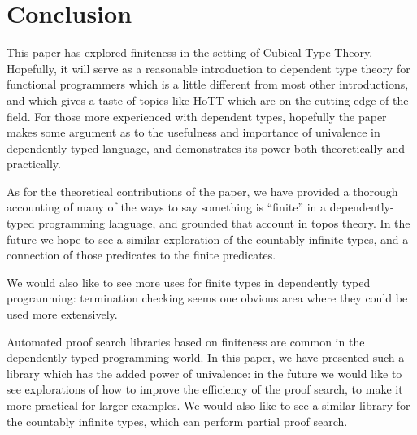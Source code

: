 \section{Conclusion}
This paper has explored finiteness in the setting of Cubical Type Theory.
Hopefully, it will serve as a reasonable introduction to dependent type theory
for functional programmers which is a little different from most other
introductions, and which gives a taste of topics like HoTT which are on the
cutting edge of the field.
For those more experienced with dependent types, hopefully the paper makes some
argument as to the usefulness and importance of univalence in dependently-typed
language, and demonstrates its power both theoretically and practically.

As for the theoretical contributions of the paper, we have provided a thorough
accounting of many of the ways to say something is ``finite'' in a
dependently-typed programming language, and grounded that account in topos
theory.
In the future we hope to see a similar exploration of the countably infinite
types, and a connection of those predicates to the finite predicates.

We would also like to see more uses for finite types in dependently typed
programming: termination checking seems one obvious area where they could be
used more extensively.

Automated proof search libraries based on finiteness are common in the
dependently-typed programming world.
In this paper, we have presented such a library which has the added power of
univalence: in the future we would like to see explorations of how to improve
the efficiency of the proof search, to make it more practical for larger
examples.
We would also like to see a similar library for the countably infinite types,
which can perform partial proof search.

